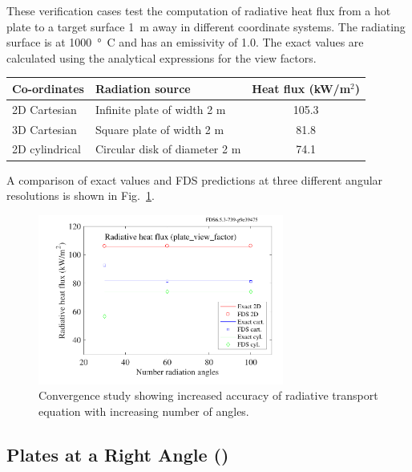 \documentclass[11pt]{book}
\begin{document}
These verification cases test the computation of radiative heat flux from a hot plate to a target surface 1~m away in different coordinate systems. The radiating surface is at 1000~\si{\degree C} and has an emissivity of 1.0.  The exact values are calculated using the analytical expressions for the view factors.
\begin{center}
\begin{tabular}{|l|l|c|}
\hline Co-ordinates & Radiation source & Heat flux (kW/m$^2$)  \\ \hline \hline
2D Cartesian   & Infinite plate of width 2 m   & 105.3 \\
3D Cartesian   & Square plate of width 2 m     & 81.8 \\
2D cylindrical & Circular disk of diameter 2 m & 74.1 \\ \hline
\end{tabular}
\end{center}
A comparison of exact values and FDS predictions at three different angular resolutions is shown in Fig.~\ref{fig_plate_view_factor}.
\begin{figure}[ht]
\centering
\includegraphics[height=2.2in]{SCRIPT_FIGURES/plate_view_factor}
\caption[The {\ct plate\_view\_factor} test case]{Convergence study showing increased accuracy of radiative transport equation with increasing number of angles.}
\label{fig_plate_view_factor}
\end{figure}

\subsection{Plates at a Right Angle (\texorpdfstring{}{geom\_rad}) }
\label{geom_rad}
\end{document}
